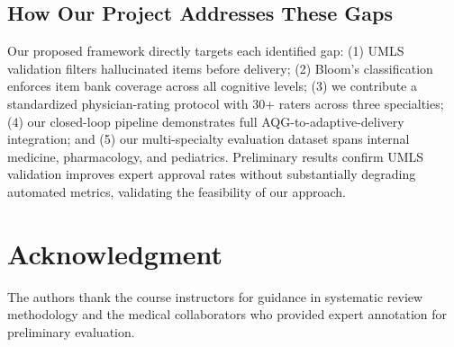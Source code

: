 \documentclass[conference]{IEEEtran}
\begin{document}
\subsection{How Our Project Addresses These Gaps}

Our proposed framework directly targets each identified gap: (1) UMLS validation filters hallucinated items before delivery; (2) Bloom's classification enforces item bank coverage across all cognitive levels; (3) we contribute a standardized physician-rating protocol with 30+ raters across three specialties; (4) our closed-loop pipeline demonstrates full AQG-to-adaptive-delivery integration; and (5) our multi-specialty evaluation dataset spans internal medicine, pharmacology, and pediatrics. Preliminary results confirm UMLS validation improves expert approval rates without substantially degrading automated metrics, validating the feasibility of our approach.

\section*{Acknowledgment}

The authors thank the course instructors for guidance in systematic review methodology and the medical collaborators who provided expert annotation for preliminary evaluation.



\end{document}

